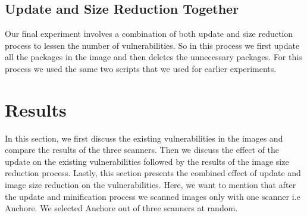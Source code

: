\documentclass[a4paper,num-refs]{oup-contemporary}
\begin{document}
\subsection{Update and Size Reduction Together}

Our final experiment involves a combination of both update and size reduction process
to lessen the number of vulnerabilities.
So in this process we first update all the packages in the image and then deletes
the unnecessary packages. For this process we used the same two scripts that
we used for earlier experiments.

\section{Results}

In this section,
we first discuss the existing vulnerabilities in the images and compare the
results of the three scanners. Then we discuss the effect of the update on the
existing vulnerabilities followed by the results of the image size reduction
process. Lastly, this section presents the combined effect of update and image size reduction on the
vulnerabilities. Here, we want to mention that after the update and minification process we scanned
images only with one scanner i.e Anchore. We selected Anchore out of three scanners at random.
\end{document}
